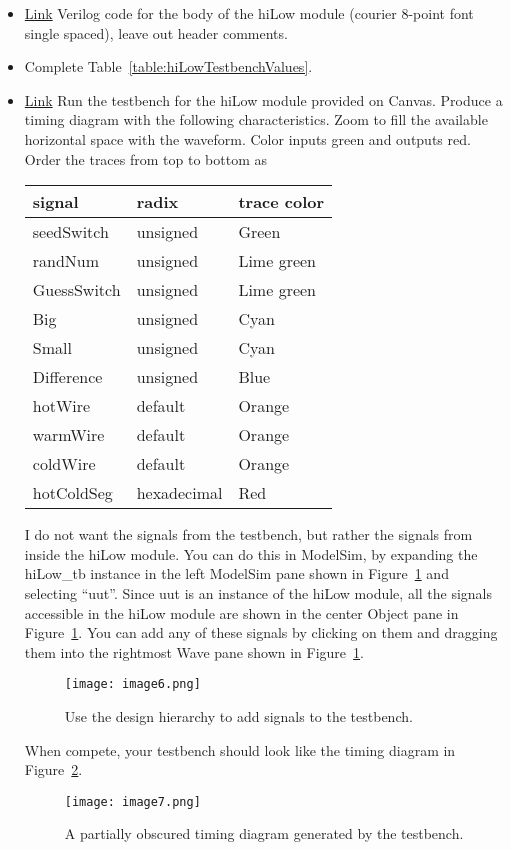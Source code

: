 \begin{itemize}
\item
  \protect\hyperlink{hilow-module}{Link} Verilog code for the body of
  the hiLow module (courier 8-point font single spaced), leave out
  header comments.
\item
  Complete Table~\ref{table:hiLowTestbenchValues}.
\item
  \protect\hyperlink{hilow_tb-module}{Link} Run the testbench for the
  hiLow module provided on Canvas. Produce a timing diagram with the
  following characteristics. Zoom to fill the available horizontal space
  with the waveform. Color inputs green and outputs red. Order the
  traces from top to bottom as

  \begin{tabular}{p{4cm}p{4cm}p{4cm}}
   signal & radix & trace color \\ \hline
    seedSwitch  &  unsigned & Green  \\
    randNum  &  unsigned  & Lime green  \\
    GuessSwitch  &  unsigned  & Lime green  \\
    Big   & unsigned &  Cyan  \\
    Small  &  unsigned &  Cyan  \\
    Difference  &  unsigned &  Blue  \\
    hotWire  & default &  Orange  \\
    warmWire  & default &  Orange  \\
    coldWire  & default &  Orange  \\
    hotColdSeg  & hexadecimal &  Red  \\
\end{tabular}

I do not want the signals from the testbench, but rather the signals
from inside the hiLow module. You can do this in ModelSim, by expanding
the hiLow\_tb instance in the left ModelSim pane shown in Figure~\ref{fig:hierarchyTestbench} and
selecting ``uut''. Since uut is an instance of the hiLow module, all the
signals accessible in the hiLow module are shown in the center Object
pane in Figure~\ref{fig:hierarchyTestbench}. You can add any of these signals by clicking on them
and dragging them into the rightmost Wave pane shown in Figure~\ref{fig:hierarchyTestbench}.

\begin{figure}[ht]
\texttt{[image:  image6.png]}
\caption{Use the design hierarchy to add signals to the testbench.}
\label{fig:hierarchyTestbench}
\end{figure}

When compete, your testbench should look like the timing diagram in
Figure~\ref{fig:guessTiming}.

\begin{figure}[ht]
\texttt{[image:  image7.png]}
\caption{A partially obscured timing diagram generated by the testbench.}
\label{fig:guessTiming}
\end{figure}
\end{itemize}

